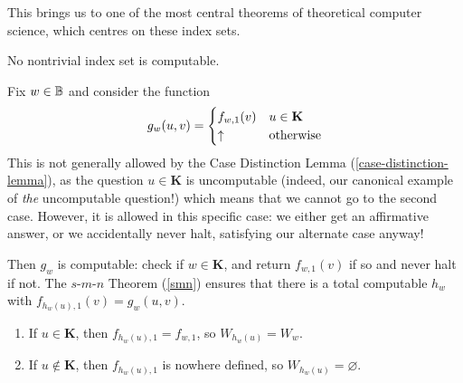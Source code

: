 \documentclass{article}
\begin{document}
This brings us to one of the most central theorems of theoretical computer science, which centres on these index sets.

\begin{theorem}
	No nontrivial index set is computable.
\end{theorem}

\begin{prf}
	Fix $w \in \mathbb{B}$ and consider the function
	\[
		g_w(u, v) = \begin{cases}
		f_{w,1}(v) & u \in \mathbf{K} \\
		\uparrow & \!\mathrel{\, \text{otherwise}}
		\end{cases}
	\]
	This is not generally allowed by the Case Distinction Lemma (\ref{case-distinction-lemma}), as the question $u \in \mathbf{K}$ is uncomputable (indeed, our canonical example of \textit{the} uncomputable question!) which means that we cannot go to the second case. However, it is allowed in this specific case: we either get an affirmative answer, or we accidentally never halt, satisfying our alternate case anyway!
		
	Then $g_w$ is computable: check if $w \in \mathbf{K}$, and return $f_{w,1}(v)$ if so and never halt if not. The $s$-$m$-$n$ Theorem (\ref{smn}) ensures that there is a total computable $h_w$ with $f_{h_w(u),1}(v) = g_w(u, v)$.
	\begin{enumerate}
		\item If $u \in \mathbf{K}$, then $f_{h_w(u),1} = f_{w,1}$, so $W_{h_w(u)} = W_w$.
		\item If $u \notin \mathbf{K}$, then $f_{h_w(u),1}$ is nowhere defined, so $W_{h_w(u)} = \varnothing$.
	\end{enumerate}
		

\end{prf}
\end{document}
